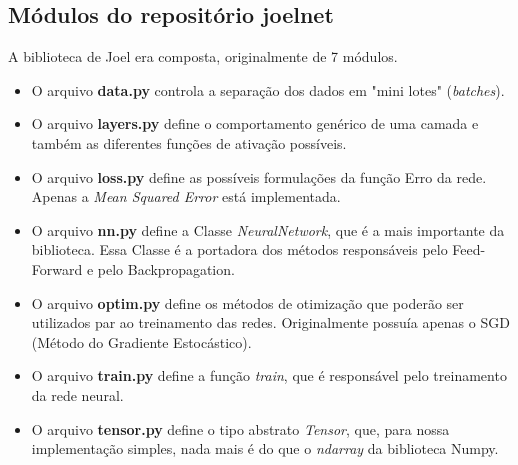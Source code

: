 \documentclass[11pt]{article}
\begin{document}
\subsection*{Módulos do repositório joelnet}
A biblioteca de Joel era composta, originalmente de 7 módulos.
\begin{itemize}
\item O arquivo \textbf{data.py} controla a separação dos dados em "mini lotes" (\textit{batches}).

\item O arquivo \textbf{layers.py} define o comportamento genérico de uma camada e também as diferentes funções de ativação possíveis.

\item O arquivo \textbf{loss.py} define as possíveis formulações da função Erro da rede. Apenas a \textit{Mean Squared Error} está implementada.

\item O arquivo \textbf{nn.py} define a Classe \textit{NeuralNetwork}, que é a mais importante da biblioteca. Essa Classe é a portadora dos métodos responsáveis pelo Feed-Forward e pelo Backpropagation.

\item O arquivo \textbf{optim.py} define os métodos de otimização que poderão ser utilizados par ao treinamento das redes. Originalmente possuía apenas o SGD (Método do Gradiente Estocástico).
\item  O arquivo \textbf{train.py} define a função \textit{train}, que é responsável pelo treinamento da rede neural.

\item O arquivo \textbf{tensor.py} define o tipo abstrato \textit{Tensor}, que, para nossa implementação simples, nada mais é do que o \textit{ndarray} da biblioteca Numpy.
\end{itemize}
\end{document}
